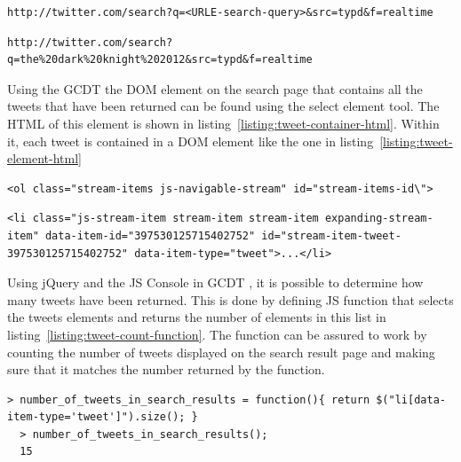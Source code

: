   \begin{lstlisting}[caption={URL of a Twitter HTTP search request for <URLE-search-query>},label={listing:search-request},captionpos=b]
  http://twitter.com/search?q=<URLE-search-query>&src=typd&f=realtime
  \end{lstlisting}

\begin{lstlisting}[caption={URL of a Twitter HTTP search request for "The Dark Knight Rises 2012" parsed to URLE},label={listing:search-request-batman-urle},captionpos=b]
  http://twitter.com/search?q=the%20dark%20knight%202012&src=typd&f=realtime
  \end{lstlisting}

Using the GCDT \cite{gcdt} the DOM element on the search page that contains all the tweets that have been returned can be found using the select element tool. The HTML of this element is shown in listing~\ref{listing:tweet-container-html}. Within it, each tweet is contained in a DOM element like the one in listing~\ref{listing:tweet-element-html}

  \begin{lstlisting}[caption={HTML of the DOM element containing all tweet elements},label={listing:tweet-container-html},captionpos=b]
  <ol class="stream-items js-navigable-stream" id="stream-items-id\">
  \end{lstlisting}

  \begin{lstlisting}[caption={HTML of a tweet element},label={listing:tweet-element-html},captionpos=b]
  <li class="js-stream-item stream-item stream-item expanding-stream-item" data-item-id="397530125715402752" id="stream-item-tweet-397530125715402752" data-item-type="tweet">...</li>
  \end{lstlisting}

Using jQuery \cite{jquery} and the JS Console in GCDT \cite{gcdt}, it is possible to determine how many tweets have been returned. This is done by defining JS function that selects the tweets elements and returns the number of elements in this list in listing~\ref{listing:tweet-count-function}. The function can be assured to work by counting the number of tweets displayed on the search result page and making sure that it matches the number returned by the function.

  \begin{lstlisting}[caption={Creating a function in GCDT JS Console for counting the occurance of tweets on the Twitter search result page},label={listing:tweet-count-function},captionpos=b]
  > number_of_tweets_in_search_results = function(){ return $("li[data-item-type='tweet']").size(); }
  > number_of_tweets_in_search_results();
  15
  \end{lstlisting}

